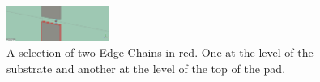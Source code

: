 \begin{figure}[h]
  	\begin{center}
 		
 		\includegraphics[width = 0.3\textwidth]{Figures/blending1}
 		\caption{A selection of two Edge Chains in red. One at the level of the substrate and another at the level of the top of the pad.}
 		\label{fig:blending1}
  	\end{center}
 \end{figure}
